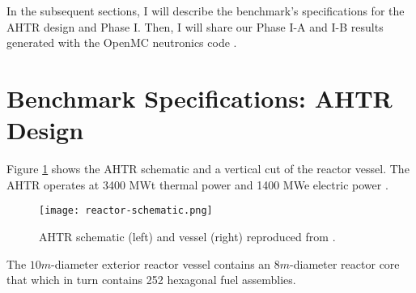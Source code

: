 In the subsequent sections, I will describe the benchmark's specifications for 
the \gls{AHTR} design and Phase I. Then, I will share our Phase I-A and I-B 
results generated with the OpenMC neutronics code \cite{romano_openmc_2013}. 

\section{Benchmark Specifications: AHTR Design}
Figure \ref{fig:reactor-schematic} shows the \acrfull{AHTR} schematic and a vertical 
cut of the reactor vessel. 
The \gls{AHTR} operates at 3400 MWt thermal power and 1400 MWe 
electric power \cite{varma_ahtr_2012}. 
\begin{figure}[]
    \centering
    \texttt{[image: reactor-schematic.png]} 
    \caption{\acrlong{AHTR} schematic (left) and vessel (right) reproduced from
    \cite{noauthor_fluoride_nodate}.}
    \label{fig:reactor-schematic}
\end{figure}
The $10m$-diameter exterior reactor vessel contains an $8m$-diameter 
reactor core that which in turn contains 252 hexagonal fuel assemblies.

